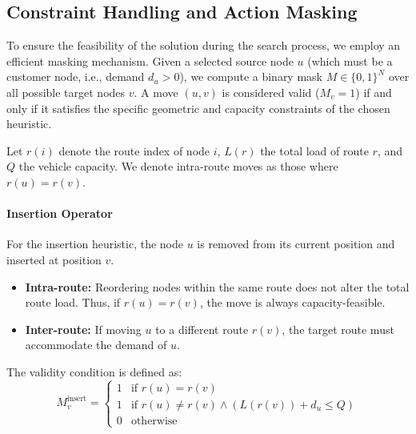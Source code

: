 \documentclass[letterpaper]{article} %
\begin{document}
\subsection{Constraint Handling and Action Masking}
To ensure the feasibility of the solution during the search process, we employ an efficient masking mechanism. Given a selected source node $u$ (which must be a customer node, i.e., demand $d_u > 0$), we compute a binary mask $M \in \{0, 1\}^N$ over all possible target nodes $v$. A move $(u, v)$ is considered valid ($M_v = 1$) if and only if it satisfies the specific geometric and capacity constraints of the chosen heuristic.

Let $r(i)$ denote the route index of node $i$, $L(r)$ the total load of route $r$, and $Q$ the vehicle capacity. We denote intra-route moves as those where $r(u) = r(v)$.

\paragraph{Insertion Operator}
For the insertion heuristic, the node $u$ is removed from its current position and inserted at position $v$.
\begin{itemize}
    \item \textbf{Intra-route:} Reordering nodes within the same route does not alter the total route load. Thus, if $r(u) = r(v)$, the move is always capacity-feasible.
    \item \textbf{Inter-route:} If moving $u$ to a different route $r(v)$, the target route must accommodate the demand of $u$.
\end{itemize}
The validity condition is defined as:
\begin{equation}
    M_v^{\text{insert}} =
    \begin{cases}
        1 & \text{if } r(u) = r(v) \\
        1 & \text{if } r(u) \neq r(v) \land (L(r(v)) + d_u \leq Q) \\
        0 & \text{otherwise}
    \end{cases}
\end{equation}
\end{document}
